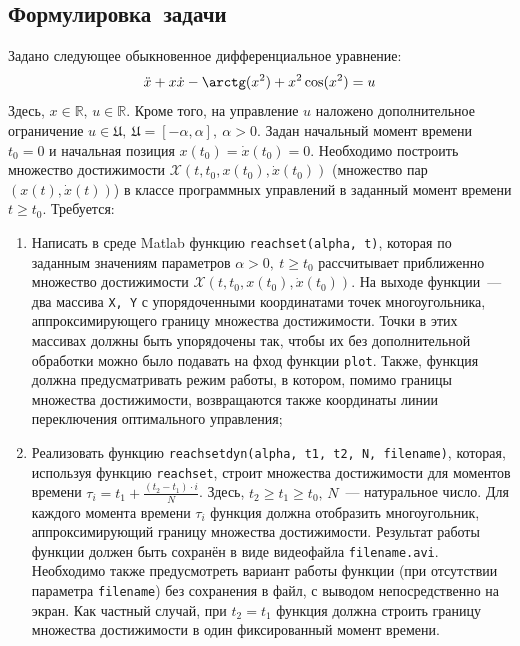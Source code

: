 \documentclass[11pt, oneside, final]{article}
\theoremstyle{break}
\numberwithin{equation}{section}
\theoremstyle{plain}
\theoremstyle{definition}
\newcommand \real{\mathbb{R}}
\begin{document}
    \subsection{Формулировка~задачи} 
    \label{sub:general}
    Задано следующее обыкновенное дифференциальное уравнение:
    \begin{equation} 
        \label{eq:system:init} 
        \ddot x + x \dot x - \arctg(x^2) + x^2\cos(x^2) = u
    \end{equation}
    Здесь, \(x \in \real,\, u \in \real \). Кроме того, на управление \( u \) наложено дополнительное ограничение \(u \in \mathfrak{U}, \: \mathfrak{U} = \left[-\alpha, \alpha\right], \: \alpha > 0 \). Задан начальный момент времени \(t_0 = 0\) и начальная позиция \(x(t_0) = \dot x(t_0) = 0\). Необходимо построить множество достижимости \(\mathcal{X}(t, t_0, x(t_0), \dot x(t_0))\) (множество пар \((x(t), \dot x(t))\)) в классе программных управлений в заданный момент времени \(t \geqslant t_0\). 
    Требуется: 
    \begin{enumerate} 
        \item Написать в среде Matlab функцию \texttt{reachset(alpha, t)}, которая по заданным значениям параметров \(\alpha > 0, \: t \geqslant t_0\) рассчитывает приближенно множество достижимости \(\mathcal{X}(t, t_0, x(t_0), \dot x(t_0))\). На выходе функции~--- два массива \texttt{X, Y} с упорядоченными координатами точек многоугольника, аппроксимирующего границу множества достижимости. Точки в этих массивах должны быть упорядочены так, чтобы их без дополнительной обработки можно было подавать на фход функции \texttt{plot}. Также, функция должна предусматривать режим работы, в котором, помимо границы множества достижимости, возвращаются также координаты линии переключения оптимального управления;
        \item Реализовать функцию \texttt{reachsetdyn(alpha, t1, t2, N, filename)}, которая, используя функцию \texttt{reachset}, строит множества достижимости для моментов времени \(\tau_i = t_1 + \frac{(t_2 - t_1)\cdot i}{N}\). Здесь, \(t_2 \geqslant t_1 \geqslant t_0,\, N\)~--- натуральное число. Для каждого момента времени \(\tau_i\) функция должна отобразить многоугольник, аппроксимирующий границу множества достижимости. Результат работы функции должен быть сохранён в виде видеофайла \texttt{filename.avi}. Необходимо также предусмотреть вариант работы функции (при отсутствии параметра \texttt{filename}) без сохранения в файл, с выводом непосредственно на экран. Как частный случай, при \(t_2 = t_1\) функция должна строить границу множества достижимости в один фиксированный момент времени.
    \end{enumerate}
    \pagebreak
\end{document}
